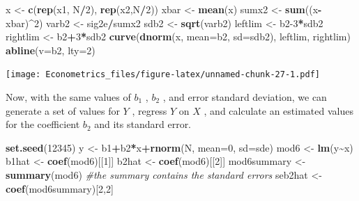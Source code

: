 \documentclass[
]{book}
\newenvironment{Shaded}{\begin{snugshade}}{\end{snugshade}}
\newcommand{\AttributeTok}[1]{\textcolor[rgb]{0.13,0.29,0.53}{#1}}
\newcommand{\CommentTok}[1]{\textcolor[rgb]{0.56,0.35,0.01}{\textit{#1}}}
\newcommand{\DecValTok}[1]{\textcolor[rgb]{0.00,0.00,0.81}{#1}}
\newcommand{\FunctionTok}[1]{\textcolor[rgb]{0.13,0.29,0.53}{\textbf{#1}}}
\newcommand{\NormalTok}[1]{#1}
\newcommand{\OtherTok}[1]{\textcolor[rgb]{0.56,0.35,0.01}{#1}}
\newcommand{\SpecialCharTok}[1]{\textcolor[rgb]{0.81,0.36,0.00}{\textbf{#1}}}
\begin{document}
\begin{Shaded}
\begin{Highlighting}[]
\NormalTok{x }\OtherTok{\textless{}{-}} \FunctionTok{c}\NormalTok{(}\FunctionTok{rep}\NormalTok{(x1, N}\SpecialCharTok{/}\DecValTok{2}\NormalTok{), }\FunctionTok{rep}\NormalTok{(x2,N}\SpecialCharTok{/}\DecValTok{2}\NormalTok{))}
\NormalTok{xbar }\OtherTok{\textless{}{-}} \FunctionTok{mean}\NormalTok{(x)}
\NormalTok{sumx2 }\OtherTok{\textless{}{-}} \FunctionTok{sum}\NormalTok{((x}\SpecialCharTok{{-}}\NormalTok{xbar)}\SpecialCharTok{\^{}}\DecValTok{2}\NormalTok{)}
\NormalTok{varb2 }\OtherTok{\textless{}{-}}\NormalTok{ sig2e}\SpecialCharTok{/}\NormalTok{sumx2}
\NormalTok{sdb2 }\OtherTok{\textless{}{-}} \FunctionTok{sqrt}\NormalTok{(varb2)}
\NormalTok{leftlim }\OtherTok{\textless{}{-}}\NormalTok{ b2}\DecValTok{{-}3}\SpecialCharTok{*}\NormalTok{sdb2}
\NormalTok{rightlim }\OtherTok{\textless{}{-}}\NormalTok{ b2}\SpecialCharTok{+}\DecValTok{3}\SpecialCharTok{*}\NormalTok{sdb2}
\FunctionTok{curve}\NormalTok{(}\FunctionTok{dnorm}\NormalTok{(x, }\AttributeTok{mean=}\NormalTok{b2, }\AttributeTok{sd=}\NormalTok{sdb2), leftlim, rightlim)}
\FunctionTok{abline}\NormalTok{(}\AttributeTok{v=}\NormalTok{b2, }\AttributeTok{lty=}\DecValTok{2}\NormalTok{)}
\end{Highlighting}
\end{Shaded}

\texttt{[image: Econometrics\_files/figure-latex/unnamed-chunk-27-1.pdf]}

Now, with the same values of \(b_1\) , \(b_2\) , and error standard deviation, we can generate a set of values for \(Y\) , regress \(Y\) on \(X\) , and calculate an estimated values for the coefficient \(b_2\) and its standard error.

\begin{Shaded}
\begin{Highlighting}[]
\FunctionTok{set.seed}\NormalTok{(}\DecValTok{12345}\NormalTok{)}
\NormalTok{y }\OtherTok{\textless{}{-}}\NormalTok{ b1}\SpecialCharTok{+}\NormalTok{b2}\SpecialCharTok{*}\NormalTok{x}\SpecialCharTok{+}\FunctionTok{rnorm}\NormalTok{(N, }\AttributeTok{mean=}\DecValTok{0}\NormalTok{, }\AttributeTok{sd=}\NormalTok{sde)}
\NormalTok{mod6 }\OtherTok{\textless{}{-}} \FunctionTok{lm}\NormalTok{(y}\SpecialCharTok{\textasciitilde{}}\NormalTok{x)}
\NormalTok{b1hat }\OtherTok{\textless{}{-}} \FunctionTok{coef}\NormalTok{(mod6)[[}\DecValTok{1}\NormalTok{]]}
\NormalTok{b2hat }\OtherTok{\textless{}{-}} \FunctionTok{coef}\NormalTok{(mod6)[[}\DecValTok{2}\NormalTok{]]}
\NormalTok{mod6summary }\OtherTok{\textless{}{-}} \FunctionTok{summary}\NormalTok{(mod6) }\CommentTok{\#the summary contains the standard errors}
\NormalTok{seb2hat }\OtherTok{\textless{}{-}} \FunctionTok{coef}\NormalTok{(mod6summary)[}\DecValTok{2}\NormalTok{,}\DecValTok{2}\NormalTok{]}
\end{Highlighting}
\end{Shaded}
\end{document}
